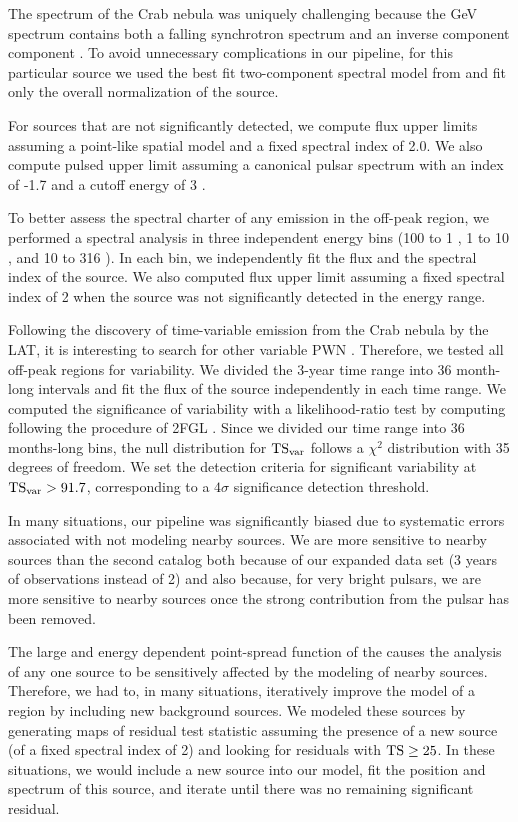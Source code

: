 The spectrum of the Crab nebula was uniquely challenging because the
GeV spectrum contains both a falling synchrotron spectrum and an
inverse component component \citep{LAT_collaboration_crab_2010}.
To avoid unnecessary complications in our pipeline, for this
particular source we used the best fit two-component spectral model from
\cite{LAT_collaboration_crab_2012} and fit only the overall normalization
of the source.

For sources that are not significantly detected, we compute flux upper
limits assuming a point-like spatial model and a fixed spectral index
of 2.0.  We also compute pulsed upper limit assuming a canonical pulsar
spectrum with an index of -1.7 and a cutoff energy of 3 \gev.

To better assess the spectral charter of any emission in the off-peak
region, we performed a spectral analysis in three independent energy bins
(100 \mev to 1 \gev, 1 \gev to 10 \gev, and 10 \gev to 316 \gev). In each
bin, we independently fit the flux and the spectral index of the source.
We also computed flux upper limit assuming a fixed spectral index of 2
when the source was not significantly detected in the energy range.

Following the discovery of time-variable emission from the Crab nebula
by the LAT, it is interesting to search for other variable PWN
\citep{LAT_Collaboration_Crab_Flare_2011}.  Therefore, we tested all 
off-peak regions for variability.  We divided the 3-year time range
into 36 month-long intervals and fit the flux of the source independently
in each time range. We computed the significance of variability
with a likelihood-ratio test by computing \tsvar following the procedure of 2FGL
\citep{LAT_Collaboration_2FGL_2012}.  Since we divided our time range into 
36 months-long bins, the null distribution for $\text{TS}_\text{var}$ follows a $\chi^2$
distribution with 35 degrees of freedom. We set the detection criteria
for significant variability at $\text{TS}_\text{var}>91.7$, corresponding to a $4\sigma$
significance detection threshold.

In many situations, our pipeline was significantly biased due to systematic
errors associated with not modeling nearby sources.
We are more sensitive to nearby
sources than the second \lat catalog both because of our expanded data
set (3 years of observations instead of 2) and also because, for
very bright pulsars, we are more sensitive to nearby sources once
the strong contribution from the pulsar has been removed.

The large and energy dependent point-spread function of the \lat causes the analysis
of any one source to be sensitively affected by the modeling of nearby
sources. Therefore, we had to, in many situations, iteratively improve
the model of a region by including new background sources. 
We modeled these sources by
generating maps of residual test statistic assuming the presence of a
new source (of a fixed spectral index of 2) and looking for residuals with
$\text{TS}\ge25$. In these situations, we would include a new source into our
model, fit the position and spectrum of this source, and iterate until
there was no remaining significant residual.

